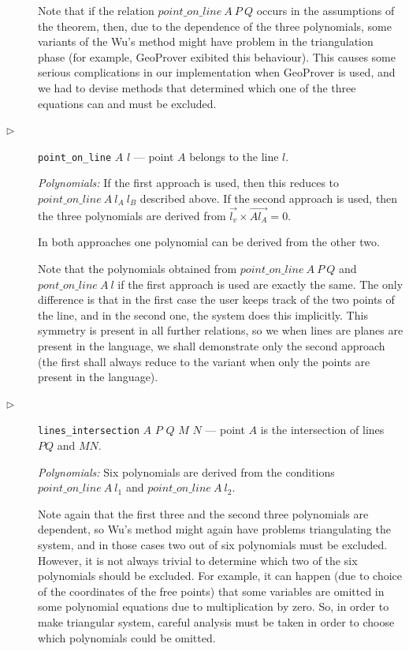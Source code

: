 \documentclass[final,1p,times,authoryear]{elsarticle}
\begin{document}
\begin{description}
Note that if the relation $point\_on\_line\ A\ P\ Q$ occurs in the
assumptions of the theorem, then, due to the dependence of the three
polynomials, some variants of the Wu's method might have problem in
the triangulation phase (for example, GeoProver exibited this
behaviour). This causes some serious complications in our
implementation when GeoProver is used, and we had to devise methods
that determined which one of the three equations can and must be
excluded.

\item[$\triangleright$] {\tt point\_on\_line} $A$ $l$ --- point $A$ belongs
  to the line $l$.

{\em Polynomials:} If the first approach is used, then this reduces to
$point\_on\_line\ A\ l_A\ l_B$ described above. If the second approach is
used, then the three polynomials are derived from
$\overrightarrow{l_v} \times \overrightarrow{Al_A} = 0$.

In both approaches one polynomial can be derived from the other two.

\bigskip 

Note that the polynomials obtained from $point\_on\_line\ A\ P\ Q$ and
$pont\_on\_line\ A\ l$ if the first approach is used are exactly the same.
The only difference is that in the first case the user keeps track of
the two points of the line, and in the second one, the system does
this implicitly. This symmetry is present in all further relations, so
we when lines are planes are present in the language, we shall
demonstrate only the second approach (the first shall always reduce to
the variant when only the points are present in the language).


\item[$\triangleright$] {\tt lines\_intersection} $A$ $P$ $Q$ $M$ $N$
  --- point $A$ is the intersection of lines $PQ$ and $MN$.

{\em Polynomials:} Six polynomials are derived from the conditions
$point\_on\_line\ A\ l_1$ and $point\_on\_line\ A\ l_2$.

Note again that the first three and the second three polynomials are
dependent, so Wu's method might again have problems triangulating the
system, and in those cases two out of six polynomials must be
excluded. However, it is not always trivial to determine which two of
the six polynomials should be excluded. For example, it can happen
(due to choice of the coordinates of the free points) that some
variables are omitted in some polynomial equations due to
multiplication by zero. So, in order to make triangular system,
careful analysis must be taken in order to choose which polynomials
could be omitted.


\end{description}
\end{document}

